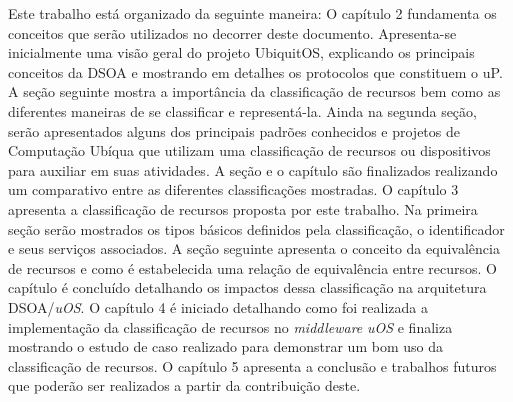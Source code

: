 Este trabalho está organizado da seguinte maneira: O capítulo 2 fundamenta os conceitos que serão utilizados no decorrer deste documento. Apresenta-se inicialmente uma visão geral do projeto UbiquitOS, explicando os principais conceitos da DSOA e mostrando em detalhes os protocolos que constituem o uP. A seção seguinte mostra a importância da classificação de recursos bem como as diferentes maneiras de se classificar e representá-la. Ainda na segunda seção, serão apresentados alguns dos principais padrões conhecidos e projetos de Computação Ubíqua que utilizam uma classificação de recursos ou dispositivos para auxiliar em suas atividades. A seção e o capítulo são finalizados realizando um comparativo entre as diferentes classificações mostradas. O capítulo 3 apresenta a classificação de recursos proposta por este trabalho. Na primeira seção serão mostrados os tipos básicos definidos pela classificação, o identificador e seus serviços associados. A seção seguinte apresenta o conceito da equivalência de recursos e como é estabelecida uma relação de equivalência entre recursos. O capítulo é concluído detalhando os impactos dessa classificação na arquitetura DSOA/\emph{uOS}. O capítulo 4 é iniciado detalhando como foi realizada a implementação da classificação de recursos no \emph{middleware} \emph{uOS} e finaliza mostrando o estudo de caso realizado para demonstrar um bom uso da classificação de recursos. O capítulo 5 apresenta a conclusão e trabalhos futuros que poderão ser realizados a partir da contribuição deste.